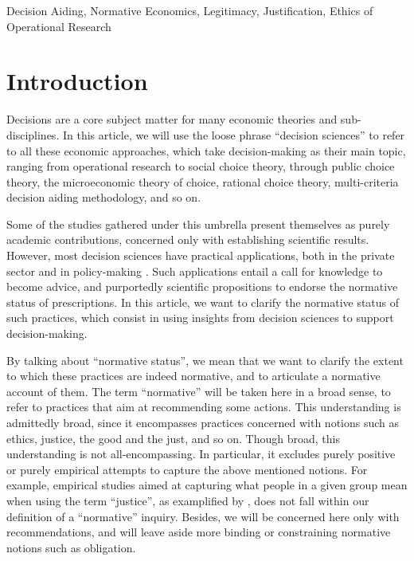\documentclass[preprint, french, english, 11pt, authoryear]{elsarticle}%
\begin{document}
\begin{keyword}
Decision Aiding, Normative Economics, Legitimacy, Justification, Ethics of Operational Research
\end{keyword}

\maketitle

\section{Introduction}
Decisions are a core subject matter for many economic theories and sub-disciplines. In this article, we will use the loose phrase “decision sciences” to refer to all these economic approaches, which take decision-making as their main topic, ranging from operational research to social choice theory, through public choice theory, the microeconomic theory of choice, rational choice theory, multi-criteria decision aiding methodology, and so on.

Some of the studies gathered under this umbrella present themselves as purely academic contributions, concerned only with establishing scientific results. However, most decision sciences have practical applications, both in the private sector and in policy-making \citep{tsoukias_policy_2013,marchi_evidence-based_2016}. Such applications entail a call for knowledge to become advice, and purportedly scientific propositions to endorse the normative status of prescriptions. 
In this article, we want to clarify the normative status of such practices, which consist in using insights from decision sciences to support decision-making.

By talking about “normative status”, we mean that we want to clarify the extent to which these practices are indeed normative, and to articulate a normative account of them. 
The term “normative” will be taken here in a broad sense, to refer to practices that aim at recommending some actions. This understanding is admittedly broad, since it encompasses practices concerned with notions such as ethics, justice, the good and the just, and so on. 
Though broad, this understanding is not all-encompassing. In particular, it excludes purely positive or purely empirical attempts to capture the above mentioned notions. For example, empirical studies aimed at capturing what people in a given group mean when using the term “justice”, as examplified by \citet{gaertner_empirical_2012}, does not fall within our definition of a “normative” inquiry. Besides, we will be concerned here only with recommendations, and will leave aside more binding or constraining normative notions such as obligation.
\end{document}
